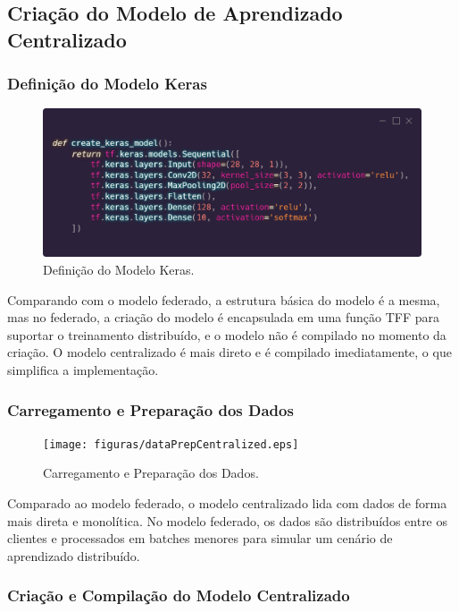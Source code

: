 \subsection{Criação do Modelo de Aprendizado Centralizado}

\subsubsection{Definição do Modelo Keras}

\begin{figure}[ht]
    \centering
    \includegraphics[scale=0.25]{figuras/kerasCentralized.eps}
    \caption{Definição do Modelo Keras.}
    \label{fig:kerasCentralized}
\end{figure}

Comparando com o modelo federado, a estrutura básica do modelo é a mesma, mas no federado, a criação do modelo é encapsulada em uma função TFF para suportar o treinamento distribuído, e o modelo não é compilado no momento da criação. O modelo centralizado é mais direto e é compilado imediatamente, o que simplifica a implementação.

\subsubsection{Carregamento e Preparação dos Dados}

\begin{figure}[ht]
    \centering
    \texttt{[image: figuras/dataPrepCentralized.eps]}
    \caption{Carregamento e Preparação dos Dados.}
    \label{fig:dataPrepCentralized}
\end{figure}

Comparado ao modelo federado, o modelo centralizado lida com dados de forma mais direta e monolítica. No modelo federado, os dados são distribuídos entre os clientes e processados em batches menores para simular um cenário de aprendizado distribuído.

\subsubsection{Criação e Compilação do Modelo Centralizado}


